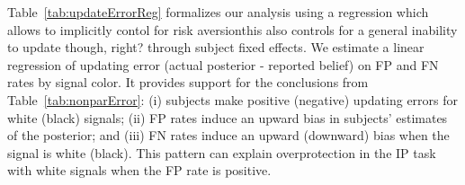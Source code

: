 \documentclass[12pt,a4paper]{article}
\newcommand{\pmt}[1]{{\color{Blue}#1}}
\begin{document}
Table~\ref{tab:updateErrorReg} formalizes our analysis using a regression which allows to implicitly contol for risk aversion\pmt{this also controls for a general inability to update though, right?} through subject fixed effects. We estimate a linear regression of updating error (actual posterior - reported belief) on FP and FN rates by signal color. It provides support for the conclusions from Table~\ref{tab:nonparError}: (i) subjects make positive (negative) updating errors for white (black) signals; (ii) FP rates induce an upward bias in subjects' estimates of the posterior; and (iii) FN rates induce an upward (downward) bias when the signal is white (black). This pattern can explain overprotection in the IP task with white signals when the FP rate is positive.



\begin{table}[H]\centering 
\caption{Average Updating Error by Signal Type} 
\label{tab:nonparError}
\end{table}
\end{document}
